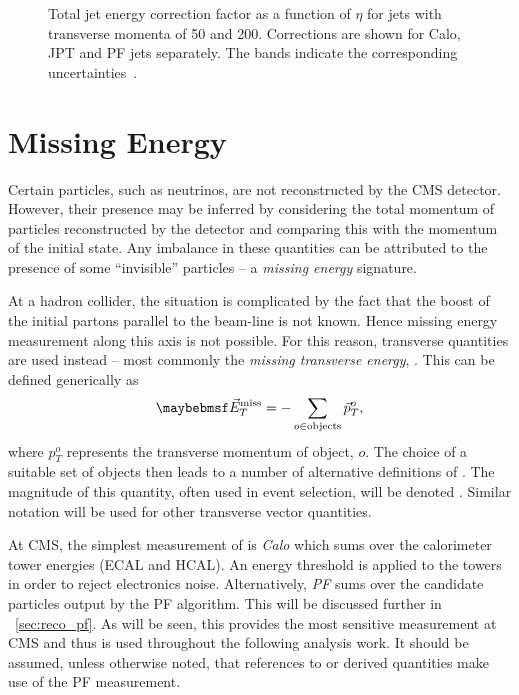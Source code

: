 \begin{figure}[h!]
  \centering
  \quad
  \quad
  \caption[Total jet energy correction factor as a function of $\eta$]{Total jet
    energy correction factor as a function of $\eta$ for jets with transverse
    momenta of  \unit{50}{\GeV} and
     \unit{200}{\GeV}. Corrections are shown for
    \ac{Calo}, \ac{JPT} and \ac{PF} jets separately. The bands indicate the
    corresponding uncertainties~\cite{jet_energy_pas}.}
  \label{fig:reco_jet_energy_corr}
\end{figure}

\section{Missing Energy}
\label{sec:reco_missing_energy}
Certain particles, such as neutrinos, are not reconstructed by the \ac{CMS}
detector. However, their presence may be inferred by considering the total
momentum of particles reconstructed by the detector and comparing this with the
momentum of the initial state. Any imbalance in these quantities can be
attributed to the presence of some ``invisible'' particles -- a \emph{missing
  energy} signature.

At a hadron collider, the situation is complicated by the fact that the boost of
the initial partons parallel to the beam-line is not known. Hence missing energy
measurement along this axis is not possible. For this reason, transverse
quantities are used instead -- most commonly the \emph{missing transverse
  energy}, \METv. This can be defined generically as
\begin{equation*}
\METv = -\sum_{o \in \textrm{objects}} \vec{p}_T^o,
\end{equation*}
where $p_T^o$ represents the transverse momentum of object, $o$. The choice of a
suitable set of objects then leads to a number of alternative definitions of
\METv. The magnitude of this quantity, often used in event selection, will be
denoted \MET. Similar notation will be used for other transverse vector
quantities.

At \ac{CMS}, the simplest measurement of \METv is \emph{\ac{Calo} \METv} which
sums over the calorimeter tower energies (\ac{ECAL} and \ac{HCAL}).  An energy
threshold is applied to the towers in order to reject electronics
noise. Alternatively, \emph{\ac{PF} \METv} sums over the candidate particles output by
the \ac{PF} algorithm. This will be discussed further in
\sec~\ref{sec:reco_pf}. As will be seen, this provides the most sensitive \METv
measurement at \ac{CMS} and thus is used throughout the following analysis
work. It should be assumed, unless otherwise noted, that references to \METv or
derived quantities make use of the \ac{PF} measurement.

